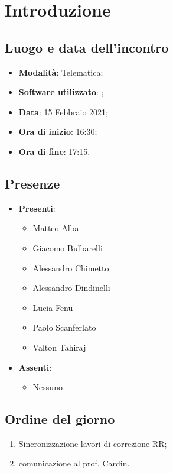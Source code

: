 \documentclass[]{article}
\begin{document}
	

	\newpage


		\section{Introduzione}
		\subsection{Luogo e data dell'incontro}
		\begin{itemize}
			\item \textbf{Modalità}: Telematica;
			\item \textbf{Software utilizzato}: ;
			\item \textbf{Data}: 15 Febbraio 2021;
			\item \textbf{Ora di inizio}: 16:30;
			\item \textbf{Ora di fine}: 17:15.
		\end{itemize}

		\subsection{Presenze}
		\begin{itemize}
			\item \textbf{Presenti}:
			\begin{itemize}
				\item Matteo Alba
				\item Giacomo Bulbarelli
				\item Alessandro Chimetto
				\item Alessandro Dindinelli
				\item Lucia Fenu
				\item Paolo Scanferlato
				\item Valton Tahiraj
			\end{itemize}
			\item \textbf{Assenti}:
			\begin{itemize}
				\item Nessuno
			\end{itemize}
		\end{itemize}


		\subsection{Ordine del giorno}
		\begin{enumerate}
			\item Sincronizzazione lavori di correzione RR;
			\item comunicazione al prof. Cardin.
		\end{enumerate}
\end{document}
